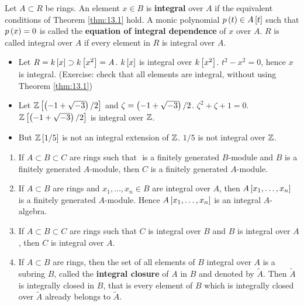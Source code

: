 \begin{definition}
Let $ A \subset R $ be rings. An element $ x \in B $ is \textbf{integral} over $ A $ if the equivalent conditions of Theorem \ref{thm:13.1} hold. A monic polynomial $ p\rb{t} \in A\sb{t} $ such that $ p\rb{x} = 0 $ is called the \textbf{equation of integral dependence} of $ x $ over $ A $. $ R $ is called integral over $ A $ if every element in $ R $ is integral over $ A $.
\end{definition}

\begin{example*}
\hfill
\begin{itemize}
\item Let $ R = k\sb{x} \supset k\sb{x^2} = A $. $ k\sb{x} $ is integral over $ k\sb{x^2} $. $ t^2 - x^2 = 0 $, hence $ x $ is integral. (Exercise: check that all elements are integral, without using Theorem \ref{thm:13.1})
\item Let $ \Z\sb{\rb{-1 + \sqrt{-3}} / 2} $ and $ \zeta = \rb{-1 + \sqrt{-3}} / 2 $. $ \zeta^2 + \zeta + 1 = 0 $. $ \Z\sb{\rb{-1 + \sqrt{-3}} / 2} $ is integral over $ \Z $.
\item But $ \Z\sb{1 / 5} $ is not an integral extension of $ \Z $. $ 1 / 5 $ is not integral over $ \Z $.
\end{itemize}
\end{example*}

\pagebreak

\begin{lemma}
\hfill
\begin{enumerate}
\item If $ A \subset B \subset C $ are rings such that $  $ is a finitely generated $ B $-module and $ B $ is a finitely generated $ A $-module, then $ C $ is a finitely generated $ A $-module.
\item If $ A \subset B $ are rings and $ x_1, \dots, x_n \in B $ are integral over $ A $, then $ A\sb{x_1, \dots, x_n} $ is a finitely generated $ A $-module. Hence $ A\sb{x_1, \dots, x_n} $ is an integral $ A $-algebra.
\item If $ A \subset B \subset C $ are rings such that $ C $ is integral over $ B $ and $ B $ is integral over $ A $, then $ C $ is integral over $ A $.
\item If $ A \subset B $ are rings, then the set of all elements of $ B $ integral over $ A $ is a subring $ B $, called the \textbf{integral closure} of $ A $ in $ B $ and denoted by $ \widetilde{A} $. Then $ \widetilde{A} $ is integrally closed in $ B $, that is every element of $ B $ which is integrally closed over $ \widetilde{A} $ already belongs to $ \widetilde{A} $.
\end{enumerate}
\end{lemma}

